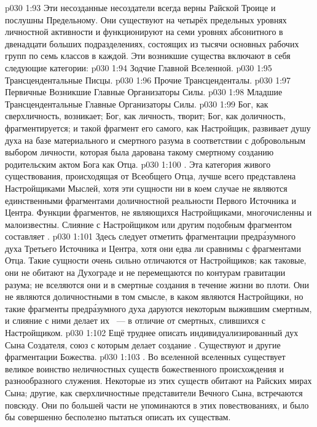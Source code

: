 \vs p030 1:93 Эти несозданные несоздатели всегда верны Райской Троице и послушны Предельному. Они существуют на четырёх предельных уровнях личностной активности и функционируют на семи уровнях абсонитного в двенадцати больших подразделениях, состоящих из тысячи основных рабочих групп по семь классов в каждой. Эти возникшие существа включают в себя следующие категории:
\vs p030 1:94 Зодчие Главной Вселенной.
\vs p030 1:95 Трансцендентальные Писцы.
\vs p030 1:96 Прочие Трансценденталы.
\vs p030 1:97 Первичные Возникшие Главные Организаторы Силы.
\vs p030 1:98 Младшие Трансцендентальные Главные Организаторы Силы.
\vs p030 1:99 \pc Бог, как сверхличность, возникает; Бог, как личность, творит; Бог, как доличность, фрагментируется; и такой фрагмент его самого, как Настройщик, развивает душу духа на базе материального и смертного разума в соответствии с добровольным выбором личности, которая была дарована такому смертному созданию родительским актом Бога как Отца.
\vs p030 1:100 . Эта категория живого существования, происходящая от Всеобщего Отца, лучше всего представлена Настройщиками Мыслей, хотя эти сущности ни в коем случае не являются единственными фрагментами доличностной реальности Первого Источника и Центра. Функции фрагментов, не являющихся Настройщиками, многочисленны и малоизвестны. Слияние с Настройщиком или другим подобным фрагментом составляет .
\vs p030 1:101 Здесь следует отметить фрагментации предр\'азумного духа Третьего Источника и Центра, хотя они едва ли сравнимы с фрагментами Отца. Такие сущности очень сильно отличаются от Настройщиков; как таковые, они не обитают на Духограде и не перемещаются по контурам гравитации разума; не вселяются они и в смертные создания в течение жизни во плоти. Они не являются доличностными в том смысле, в каком являются Настройщики, но такие фрагменты предр\'азумного духа даруются некоторым выжившим смертным, и слияние с ними делает их ~--- в отличие от смертных, слившихся с Настройщиком.
\vs p030 1:102 Ещё труднее описать индивидуализированный дух Сына Создателя, союз с которым делает создание . Существуют и другие фрагментации Божества.
\vs p030 1:103 . Во вселенной вселенных существует великое воинство неличностных существ божественного происхождения и разнообразного служения. Некоторые из этих существ обитают на Райских мирах Сына; другие, как сверхличностные представители Вечного Сына, встречаются повсюду. Они по большей части не упоминаются в этих повествованиях, и было бы совершенно бесполезно пытаться описать их  существам.
